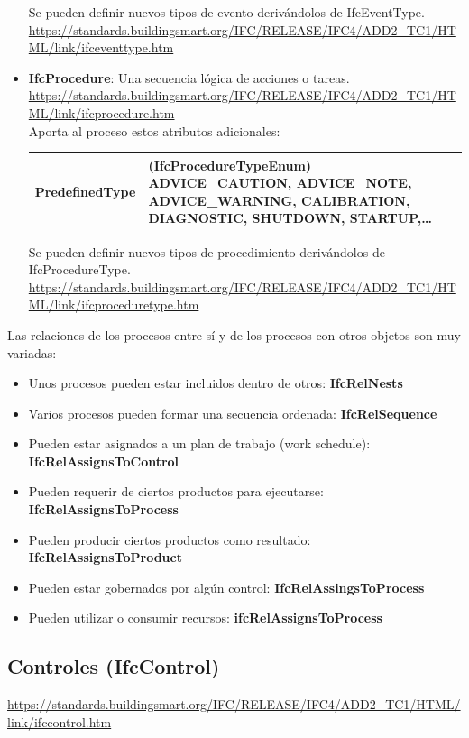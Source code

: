 \documentclass[spanish,12pt,a4paper,final,oneside]{book}
\begin{document}
\begin{itemize}
Se pueden definir nuevos tipos de evento derivándolos de IfcEventType.
\\ \url{https://standards.buildingsmart.org/IFC/RELEASE/IFC4/ADD2_TC1/HTML/link/ifceventtype.htm} 


\item \textbf{IfcProcedure}: Una secuencia lógica de acciones o tareas.
\\ \url{https://standards.buildingsmart.org/IFC/RELEASE/IFC4/ADD2_TC1/HTML/link/ifcprocedure.htm}
\\Aporta al proceso estos atributos adicionales:
\\ \begin{longtable}{|p{3.5cm} p{10cm}|}
\hline
PredefinedType & (IfcProcedureTypeEnum) ADVICE\_CAUTION, ADVICE\_NOTE, ADVICE\_WARNING, CALIBRATION, DIAGNOSTIC, SHUTDOWN, STARTUP,\ldots
\\[0.1cm] \hline
\end{longtable}

Se pueden definir nuevos tipos de procedimiento derivándolos de IfcProcedureType.
\\ \url{https://standards.buildingsmart.org/IFC/RELEASE/IFC4/ADD2_TC1/HTML/link/ifcproceduretype.htm} 

\end{itemize}

\vspace{0.3cm}
Las relaciones de los procesos entre sí y de los procesos con otros objetos son muy variadas:
\begin{itemize}
\item Unos procesos pueden estar incluidos dentro de otros: \textbf{IfcRelNests}
\item Varios procesos pueden formar una secuencia ordenada: \textbf{IfcRelSequence}
\item Pueden estar asignados a un plan de trabajo (work schedule): \textbf{IfcRelAssignsToControl}
\item Pueden requerir de ciertos productos para ejecutarse: \textbf{IfcRelAssignsToProcess}
\item Pueden producir ciertos productos como resultado: \textbf{IfcRelAssignsToProduct}
\item Pueden estar gobernados por algún control: \textbf{IfcRelAssingsToProcess}
\item Pueden utilizar o consumir recursos: \textbf{ifcRelAssignsToProcess}
\end{itemize}
 
\subsection{Controles (IfcControl)}
\url{https://standards.buildingsmart.org/IFC/RELEASE/IFC4/ADD2_TC1/HTML/link/ifccontrol.htm}
\end{document}
